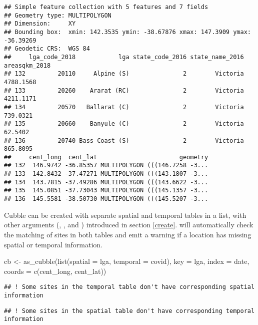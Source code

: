 \documentclass{article}
\newenvironment{Shaded}{\begin{snugshade}}{\end{snugshade}}
\newcommand{\AttributeTok}[1]{\textcolor[rgb]{0.77,0.63,0.00}{#1}}
\newcommand{\FunctionTok}[1]{\textcolor[rgb]{0.00,0.00,0.00}{#1}}
\newcommand{\NormalTok}[1]{#1}
\newcommand{\OtherTok}[1]{\textcolor[rgb]{0.56,0.35,0.01}{#1}}
\begin{document}
\begin{verbatim}
## Simple feature collection with 5 features and 7 fields
## Geometry type: MULTIPOLYGON
## Dimension:     XY
## Bounding box:  xmin: 142.3535 ymin: -38.67876 xmax: 147.3909 ymax: -36.39269
## Geodetic CRS:  WGS 84
##     lga_code_2018            lga state_code_2016 state_name_2016 areasqkm_2018
## 132         20110     Alpine (S)               2        Victoria     4788.1568
## 133         20260    Ararat (RC)               2        Victoria     4211.1171
## 134         20570   Ballarat (C)               2        Victoria      739.0321
## 135         20660    Banyule (C)               2        Victoria       62.5402
## 136         20740 Bass Coast (S)               2        Victoria      865.8095
##     cent_long  cent_lat                       geometry
## 132  146.9742 -36.85357 MULTIPOLYGON (((146.7258 -3...
## 133  142.8432 -37.47271 MULTIPOLYGON (((143.1807 -3...
## 134  143.7815 -37.49286 MULTIPOLYGON (((143.6622 -3...
## 135  145.0851 -37.73043 MULTIPOLYGON (((145.1357 -3...
## 136  145.5581 -38.50730 MULTIPOLYGON (((145.5207 -3...
\end{verbatim}

Cubble can be created with separate spatial and temporal tables in a list, with other arguments (, , and ) introduced in section \ref{create}.  will automatically check the matching of sites in both tables and emit a warning if a location has missing spatial or temporal information.

\begin{Shaded}
\begin{Highlighting}[]
\NormalTok{cb }\OtherTok{\textless{}{-}} \FunctionTok{as\_cubble}\NormalTok{(}\FunctionTok{list}\NormalTok{(}\AttributeTok{spatial =}\NormalTok{ lga, }\AttributeTok{temporal =}\NormalTok{ covid),}
                \AttributeTok{key =}\NormalTok{ lga, }\AttributeTok{index =}\NormalTok{ date, }\AttributeTok{coords =} \FunctionTok{c}\NormalTok{(cent\_long, cent\_lat))}
\end{Highlighting}
\end{Shaded}

\begin{verbatim}
## ! Some sites in the temporal table don't have corresponding spatial information
\end{verbatim}

\begin{verbatim}
## ! Some sites in the spatial table don't have corresponding temporal information
\end{verbatim}
\end{document}
